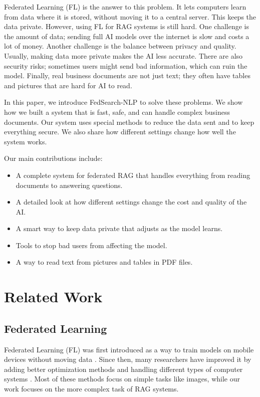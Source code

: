 \documentclass[acmsmall,screen]{acmart}
\begin{document}
Federated Learning (FL) is the answer to this problem. It lets computers learn from data where it is stored, without moving it to a central server. This keeps the data private. However, using FL for RAG systems is still hard. One challenge is the amount of data; sending full AI models over the internet is slow and costs a lot of money. Another challenge is the balance between privacy and quality. Usually, making data more private makes the AI less accurate. There are also security risks; sometimes users might send bad information, which can ruin the model. Finally, real business documents are not just text; they often have tables and pictures that are hard for AI to read.

In this paper, we introduce FedSearch-NLP to solve these problems. We show how we built a system that is fast, safe, and can handle complex business documents. Our system uses special methods to reduce the data sent and to keep everything secure. We also share how different settings change how well the system works.

Our main contributions include:
\begin{itemize}
    \item A complete system for federated RAG that handles everything from reading documents to answering questions.
    \item A detailed look at how different settings change the cost and quality of the AI.
    \item A smart way to keep data private that adjusts as the model learns.
    \item Tools to stop bad users from affecting the model.
    \item A way to read text from pictures and tables in PDF files.
\end{itemize}

\section{Related Work}

\subsection{Federated Learning}
Federated Learning (FL) was first introduced as a way to train models on mobile devices without moving data \cite{mcmahan2017communication}. Since then, many researchers have improved it by adding better optimization methods \cite{li2020federated} and handling different types of computer systems \cite{reddi2020adaptive}. Most of these methods focus on simple tasks like images, while our work focuses on the more complex task of RAG systems.
\end{document}
